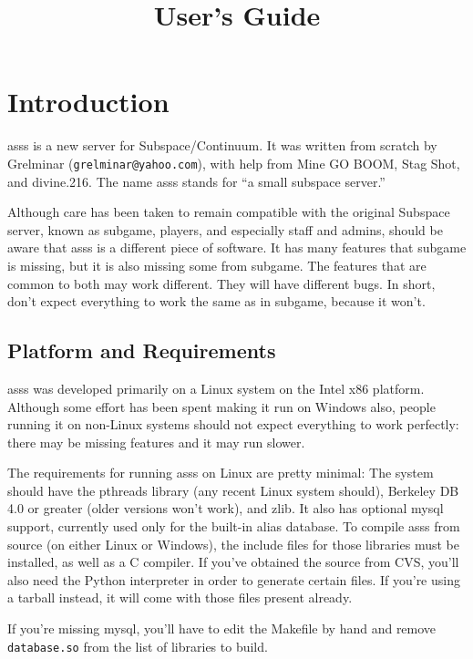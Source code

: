 \documentclass{article}
\title{\asss{} User's Guide}
\newcommand{\asss}{asss}
\newcommand{\subgame}{subgame}
\begin{document}
\maketitle

\section{Introduction}

\asss{} is a new server for Subspace/Continuum. It was written from
scratch by Grelminar (\verb/grelminar@yahoo.com/), with help from Mine
GO BOOM, Stag Shot, and divine.216.
The name \asss{} stands for ``a small subspace server.''

Although care has been taken to remain compatible with the original
Subspace server, known as \subgame{}, players, and especially staff and
admins, should be aware that \asss{} is a different piece of software. It
has many features that \subgame{} is missing, but it is also missing some
from \subgame{}. The features that are common to both may work different.
They will have different bugs. In short, don't expect everything to work
the same as in \subgame{}, because it won't.

\subsection{Platform and Requirements}

\asss{} was developed primarily on a Linux system on the Intel x86
platform. Although some effort has been spent making it run on Windows
also, people running it on non-Linux systems should not expect
everything to work perfectly: there may be missing features and it may
run slower.

The requirements for running \asss{} on Linux are pretty minimal: The
system should have the pthreads library (any recent Linux system
should), Berkeley DB 4.0 or greater (older versions won't work), and
zlib. It also has optional mysql support, currently used only for the
built-in alias database. To compile \asss{} from source (on either Linux
or Windows), the include files for those libraries must be installed, as
well as a C compiler. If you've obtained the source from CVS, you'll
also need the Python interpreter in order to generate certain files. If
you're using a tarball instead, it will come with those files present
already.

If you're missing mysql, you'll have to edit the Makefile by hand and
remove \verb/database.so/ from the list of libraries to build.
\end{document}
